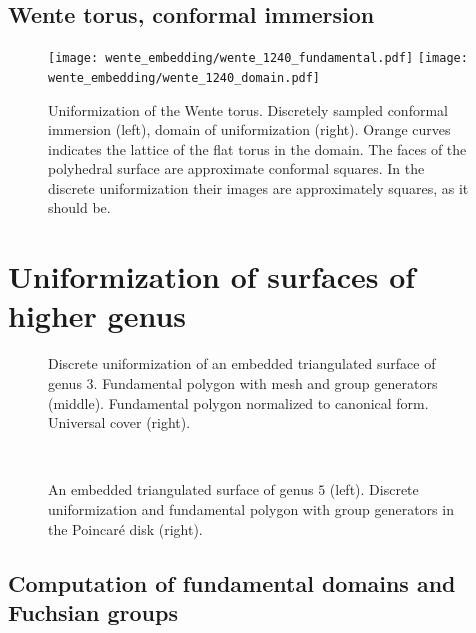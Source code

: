 \documentclass[Thesis]{subfiles}
\begin{document}
\subsection{Wente torus, conformal immersion}

\begin{figure}
\centering
\texttt{[image: wente\_embedding/wente\_1240\_fundamental.pdf]}\hfill
\texttt{[image: wente\_embedding/wente\_1240\_domain.pdf]}
\caption{Uniformization of the Wente torus. Discretely sampled conformal immersion (left), domain of uniformization (right). Orange curves indicates the lattice of the flat torus in the domain. The faces of the polyhedral surface are approximate conformal squares. In the discrete uniformization their images are approximately squares, as it should be.}
\end{figure}


\section{Uniformization of surfaces of higher genus}

\begin{figure}
\centering
{}
\caption{Discrete uniformization of an embedded triangulated surface of genus $3$. Fundamental polygon with mesh and group generators (middle). Fundamental polygon normalized to canonical form. Universal cover (right).}
\label{fig:embedded_genus_3}
\end{figure}

\begin{figure}
\centering
{}\\
\caption{An embedded triangulated surface of genus $5$ (left). Discrete uniformization and fundamental polygon with  group generators in the Poincar\'e disk (right).}
\label{fig:embedded_genus_5}
\end{figure}





\subsection{Computation of fundamental domains and Fuchsian groups}
\label{sec:fundamental_domains}
\end{document}
